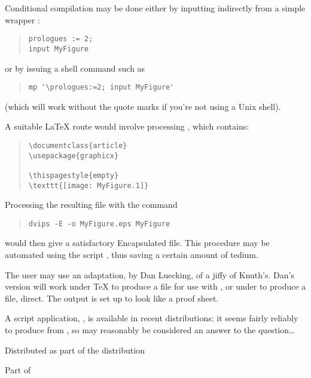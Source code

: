 Conditional compilation may be done either
by inputting  indirectly from a simple wrapper
:
\begin{quote}
\begin{verbatim}
prologues := 2;
input MyFigure
\end{verbatim}
\end{quote}
or by issuing a shell command such as
\begin{quote}
\begin{verbatim}
mp '\prologues:=2; input MyFigure'
\end{verbatim}
\end{quote}
(which will work without the quote marks if you're not using a Unix
shell).

A suitable \LaTeX{} route would involve processing
, which contains:
\begin{quote}
\begin{verbatim}
\documentclass{article}
\usepackage{graphicx}

\thispagestyle{empty}
\texttt{[image: MyFigure.1]}

\end{verbatim}
\end{quote}
Processing the resulting  file with the 
command
\begin{quote}
\begin{verbatim}
dvips -E -o MyFigure.eps MyFigure
\end{verbatim}
\end{quote}
would then give a satisfactory Encapsulated \PS{} file.  This
procedure may be automated using the  script
, thus saving a certain amount of tedium.

The \plaintex{} user may use an adaptation, by
Dan Luecking, of a jiffy of Knuth's.  Dan's version
 will work under
\TeX{} to produce a  file for use with , or
under \PDFTeX{} to produce a  file, direct.  The output is
set up to look like a proof sheet.

A script application, , is available in recent
\AllTeX{} distributions: it seems fairly reliably to produce
 from \MP{}, so may reasonably be considered an answer to
the question\dots{}
\begin{ctanrefs}
\item[mps2eps]
\item[mpsproof.tex]Distributed as part of the \MP{} distribution 
\item[mptopdf]Part of 
\end{ctanrefs}

